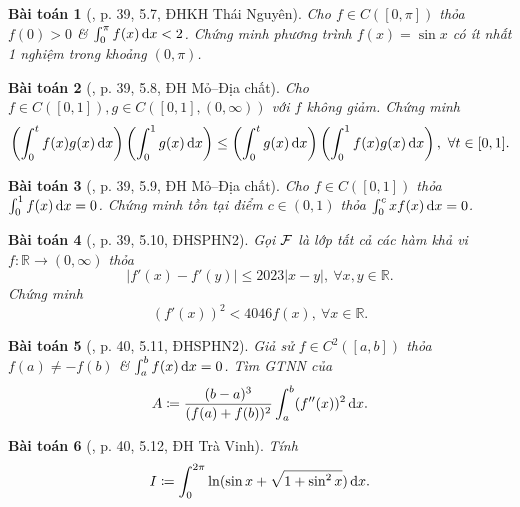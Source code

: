 \documentclass{article}
\newtheorem{baitoan}{Bài toán}
\begin{document}
\begin{baitoan}[\cite{VMS_VMC2023}, p. 39, 5.7, ĐHKH Thái Nguyên]
	Cho $f\in C([0,\pi])$ thỏa $f(0) > 0$ \& $\int_0^\pi f(x)\,{\rm d}x < 2$. Chứng minh phương trình $f(x) = \sin x$ có ít nhất 1 nghiệm trong khoảng $(0,\pi)$.
\end{baitoan}

\begin{baitoan}[\cite{VMS_VMC2023}, p. 39, 5.8, ĐH Mỏ--Địa chất]
	Cho $f\in C([0,1]),g\in C([0,1],(0,\infty))$ với $f$ không giảm. Chứng minh
	\begin{equation*}
		\left(\int_0^t f(x)g(x)\,{\rm d}x\right)\left(\int_0^1 g(x)\,{\rm d}x\right)\le\left(\int_0^t g(x)\,{\rm d}x\right)\left(\int_0^1 f(x)g(x)\,{\rm d}x\right),\ \forall t\in[0,1].
	\end{equation*}
\end{baitoan}

\begin{baitoan}[\cite{VMS_VMC2023}, p. 39, 5.9, ĐH Mỏ--Địa chất]
	Cho $f\in C([0,1])$ thỏa $\int_0^1 f(x)\,{\rm d}x = 0$. Chứng minh tồn tại điểm $c\in(0,1)$ thỏa $\int_0^c xf(x)\,{\rm d}x = 0$.
\end{baitoan}

\begin{baitoan}[\cite{VMS_VMC2023}, p. 39, 5.10, ĐHSPHN2]
	Gọi ${\cal F}$ là lớp tất cả các hàm khả vi $f:\mathbb{R}\to(0,\infty)$ thỏa
	\begin{equation*}
		|f'(x) - f'(y)|\le2023|x - y|,\ \forall x,y\in\mathbb{R}.
	\end{equation*}
	Chứng minh
	\begin{equation*}
		(f'(x))^2 < 4046f(x),\ \forall x\in\mathbb{R}.
	\end{equation*}
\end{baitoan}

\begin{baitoan}[\cite{VMS_VMC2023}, p. 40, 5.11, ĐHSPHN2]
	Giả sử $f\in C^2([a,b])$ thỏa $f(a)\ne-f(b)$ \& $\int_a^b f(x)\,{\rm d}x = 0$. Tìm {\rm GTNN} của
	\begin{equation*}
		A\coloneqq\frac{(b - a)^3}{(f(a) + f(b))^2}\int_a^b (f''(x))^2\,{\rm d}x.
	\end{equation*}
\end{baitoan}

\begin{baitoan}[\cite{VMS_VMC2023}, p. 40, 5.12, ĐH Trà Vinh]
	Tính
	\begin{equation*}
		I\coloneqq\int_0^{2\pi} \ln(\sin x + \sqrt{1 + \sin^2x})\,{\rm d}x.
	\end{equation*}
\end{baitoan}
\end{document}
